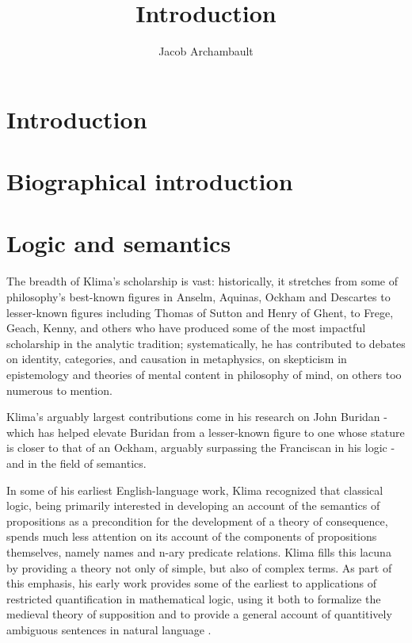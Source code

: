 \documentclass[]{article}
\title{Introduction}
\author{Jacob Archambault}
\begin{document}
\maketitle

\begin{abstract}

\end{abstract}

\section{Introduction}
\section{Biographical introduction}
\section{Logic and semantics}
The breadth of Klima's scholarship is vast: 
historically, it stretches from some of philosophy's best-known figures in Anselm, Aquinas, Ockham and Descartes to lesser-known figures including Thomas of Sutton and Henry of Ghent, to Frege, Geach, Kenny, and others who have produced some of the most impactful scholarship in the analytic tradition; 
systematically, he has contributed to debates on identity, categories, and causation in metaphysics, on skepticism in epistemology and theories of mental content in philosophy of mind, on others too numerous to mention.

Klima's arguably largest contributions come in his research on John Buridan - which has helped elevate Buridan from a lesser-known figure to one whose stature is closer to that of an Ockham, arguably surpassing the Franciscan in his logic - and in the field of semantics. 

In some of his earliest English-language work, Klima recognized that classical logic, being primarily interested in developing an account of the semantics of propositions as a precondition for the development of a theory of consequence, spends much less attention on its account of the components of propositions themselves, namely names and n-ary predicate relations. Klima fills this lacuna by providing a theory not only of simple, but also of complex terms.
As part of this emphasis, his early work provides some of the earliest to applications of restricted quantification in mathematical logic, using it both to formalize the medieval theory of supposition and to provide a general account of quantitively ambiguous sentences in natural language \autocite{Klima1988,Klima1990,KlimaSandu1990,Klima1991b}. 
\end{document}
